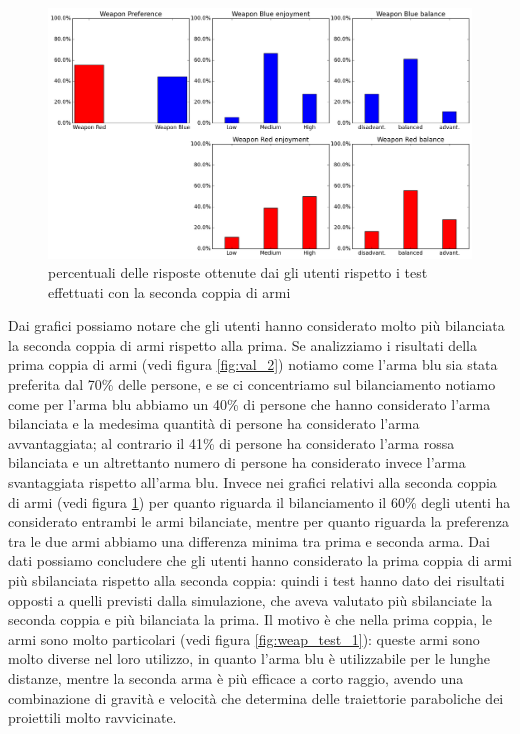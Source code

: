\documentclass[12pt, italian]{toptesi}
\begin{document}
\begin{figure}[htp]
\centering
\includegraphics[width=1.0\textwidth]{validation_1}
\caption{percentuali delle risposte ottenute dai gli utenti rispetto i test effettuati con la seconda coppia di armi}
\label{fig:val_1}
\end{figure}
Dai grafici possiamo notare che gli utenti hanno considerato molto più bilanciata la seconda coppia di armi rispetto alla prima.
Se analizziamo i risultati della prima coppia di armi (vedi figura \ref{fig:val_2}) notiamo come l'arma blu sia stata preferita dal 70\% delle persone, e se ci concentriamo sul bilanciamento notiamo come per l'arma blu abbiamo un 40\% di persone che hanno considerato l'arma bilanciata e la medesima quantità di persone ha considerato l'arma avvantaggiata; al contrario il 41\% di persone ha considerato l'arma rossa bilanciata e un altrettanto numero di persone ha considerato invece l'arma svantaggiata rispetto all'arma blu.
Invece nei grafici relativi alla seconda coppia di armi (vedi figura \ref{fig:val_1}) per quanto riguarda il bilanciamento il 60\% degli utenti ha considerato entrambi le armi bilanciate, mentre per quanto riguarda la preferenza tra le due armi abbiamo una differenza minima tra prima e seconda arma. 
Dai dati possiamo concludere che gli utenti hanno considerato la prima coppia di armi più sbilanciata rispetto alla seconda coppia: quindi i test hanno dato dei risultati opposti a quelli previsti dalla simulazione, che aveva valutato più sbilanciate la seconda coppia e più bilanciata la prima.
Il motivo è che nella prima coppia, le armi sono molto particolari (vedi figura \ref{fig:weap_test_1}): queste armi sono molto diverse nel loro utilizzo, in quanto l'arma blu è utilizzabile per le lunghe distanze, mentre la seconda arma è più efficace a corto raggio, avendo una combinazione di gravità e velocità che determina delle traiettorie paraboliche dei proiettili molto ravvicinate.
\end{document}
